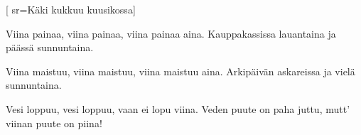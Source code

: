[
		sr={Käki kukkuu kuusikossa}]

\beginverse*
Viina painaa, viina painaa,
viina painaa aina.
Kauppakassissa lauantaina
ja päässä sunnuntaina.
\endverse

\beginverse*
Viina maistuu, viina maistuu,
viina maistuu aina.
Arkipäivän askareissa
ja vielä sunnuntaina.
\endverse

\beginverse*
Vesi loppuu, vesi loppuu,
vaan ei lopu viina.
Veden puute on paha juttu,
mutt' viinan puute on piina!
\endverse
\endsong